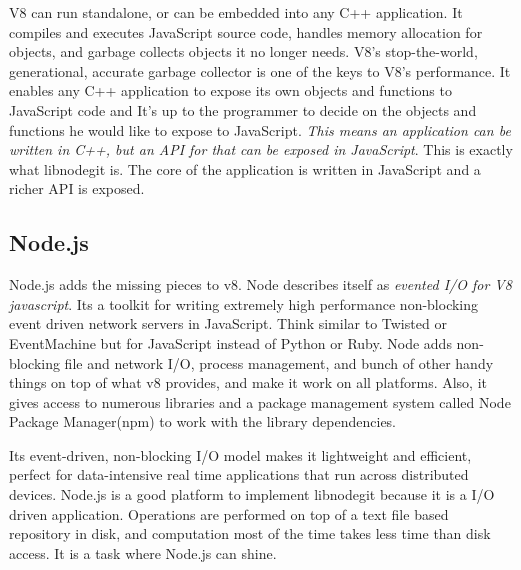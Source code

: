 V8 can run standalone, or can be embedded into any C++ application. It compiles
and executes JavaScript source code, handles memory allocation for objects, and
garbage collects objects it no longer needs. V8’s stop-the-world, generational,
accurate garbage collector is one of the keys to V8’s performance. It enables
any C++ application to expose its own objects and functions to JavaScript code
and It’s up to the programmer to decide on the objects and functions he would
like to expose to JavaScript. \textit{This means an application can be written
  in C++, but an API for that can be exposed in JavaScript}. This is exactly
what libnodegit is. The core of the application is written in JavaScript and a
richer API is exposed.

\subsection{Node.js }
Node.js adds the missing pieces to v8. Node describes itself as \textit{evented
  I/O for V8 javascript}. Its a toolkit for writing extremely high performance
non-blocking event driven network servers in JavaScript. Think similar to
Twisted\cite{twisted} or EventMachine\cite{eventmachine} but for JavaScript
instead of Python or Ruby. Node adds non-blocking file and network I/O, process
management, and bunch of other handy things on top of what v8 provides, and make
it work on all platforms. Also, it gives access to numerous libraries and a
package management system called Node Package Manager(npm)\cite{npm} to work
with the library dependencies.

Its event-driven, non-blocking I/O model makes it lightweight and efficient,
perfect for data-intensive real time applications that run across distributed
devices. Node.js is a good platform to implement libnodegit because it is a I/O
driven application. Operations are performed on top of a text file based
repository in disk, and computation most of the time takes less time than disk
access. It is a task where Node.js can shine.
